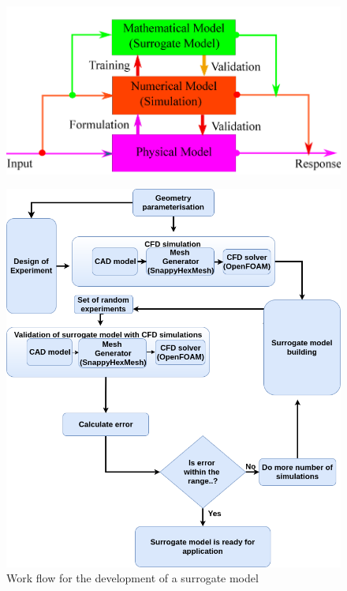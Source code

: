 \begin{figure}[H]
	\includegraphics[width=\textwidth]{optimization/surrogate.png}
	\label{Surrogate model} %
\end{figure}


\begin{figure}[htbp]
	\includegraphics[width=\textwidth]{optimization/flow_chart.png}
  
	\caption{Work flow for the development of a surrogate model}
	\label{fig:work flow for the development of a surrogate model} %
\end{figure}


